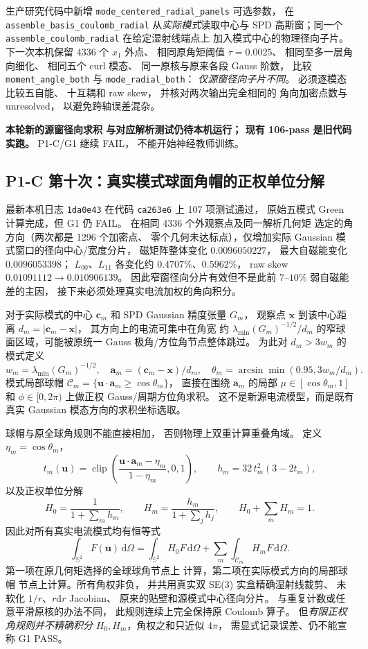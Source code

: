 生产研究代码中新增
\texttt{mode\_centered\_radial\_panels}
可选参数，
在\texttt{assemble\_basis\_coulomb\_radial}
从\emph{实际模式}读取中心与
SPD 高斯窗；同一个
\texttt{assemble\_coulomb\_radial}
在给定湿射线端点上
加入模式中心的物理径向子片。
下一次本机保留 4336 个
$x_1$ 外点、
相同原角矩阈值
$\tau=0.0025$、
相同至多一层角向细化、
相同五个 curl 模态、
同一原核与原来各段 Gauss 阶数，
比较
\texttt{moment\_angle\_both} 与
\texttt{mode\_radial\_both}：
\emph{仅源窗径向子片不同}。
必须逐模态比较五自能、
十互耦和 raw skew，
并核对两次输出完全相同的
角向加密点数与 unresolved，
以避免跨轴误差混杂。

\textbf{本轮新的源窗径向求积
与对应解析测试仍待本机运行；
现有 106-pass 是旧代码实跑。}
P1-C/G1 继续 FAIL，
不能开始神经教师训练。


\subsection{P1-C 第十次：真实模式球面角帽的正权单位分解}
\label{sec:p1-c-real-source-spherical-cap}
最新本机日志 \texttt{1da0e43} 在代码
\texttt{ca263e6} 上 107 项测试通过，
原始五模式 Green 计算完成，但 G1 仍 FAIL。
在相同 4336 个外观察点及同一解析几何矩
选定的角方向（两次都是 1296 个加密点、
零个几何未达标点），仅增加实际 Gaussian
模式窗口的径向中心/宽度分片，
磁矩阵整体变化 $0.0096050227$，
最大自磁能变化 $0.0096053398$；
$L_{00}$、$L_{11}$ 各变化约
$0.4707\%$、$0.5962\%$，
raw skew $0.01091112\to0.010906139$。
因此窄窗径向分片有效但不是此前
$7$--$10\%$ 弱自磁能差的主因，
接下来必须处理真实电流加权的角向积分。

对于实际模式的中心 $\bm c_m$ 和
SPD Gaussian 精度张量 $G_m$，
观察点 $\bm x$ 到该中心距离
$d_m=|\bm c_m-\bm x|$，
其方向上的电流可集中在角宽
约 $\lambda_{\min}(G_m)^{-1/2}/d_m$
的窄球面区域，可能被原统一
Gauss 极角/方位角节点整体跳过。
为此对 $d_m>3w_m$ 的模式定义
\[
 w_m=\lambda_{\min}(G_m)^{-1/2},\quad
 \bm a_m=(\bm c_m-\bm x)/d_m,\quad
 \theta_m=\arcsin\min(0.95,3w_m/d_m).
\]
模式局部球帽
$\mathcal C_m=\{\bm u\cdot\bm a_m
\ge\cos\theta_m\}$，
直接在围绕 $\bm a_m$ 的局部
$\mu\in[\cos\theta_m,1]$ 和
$\phi\in[0,2\pi)$ 上做正权
Gauss/周期方位角求积。
这不是新源电流模型，而是既有真实
Gaussian 模态方向的求积坐标选取。

球帽与原全球角规则不能直接相加，
否则物理上双重计算重叠角域。
定义 $\eta_m=\cos\theta_m$，
\[
 t_m(\bm u)=\operatorname{clip}
 \left(\frac{\bm u\cdot\bm a_m-\eta_m}
 {1-\eta_m},0,1\right),\qquad
 h_m=32\,t_m^2(3-2t_m),
\]
以及正权单位分解
\[
 H_0=\frac1{1+\sum_m h_m},\qquad
 H_m=\frac{h_m}{1+\sum_jh_j},\qquad
 H_0+\sum_mH_m=1.
\]
因此对所有真实电流模式均有恒等式
\[
 \int_{\mathbb S^2}F(\bm u)\,\mathrm d\Omega
 =\int_{\mathbb S^2}H_0F\,\mathrm d\Omega
  +\sum_m\int_{\mathcal C_m}H_mF\,\mathrm d\Omega.
\]
第一项在原几何矩选择的全球球角节点上
计算，第二项在实际模式方向的局部球帽
节点上计算。所有角权非负，
并共用真实双 SE(3) 实盒精确湿射线裁剪、
未软化 $1/r$、$r\mathrm dr$ Jacobian、
原来的贴壁和源模式中心径向分片。
与重复计数或任意平滑原核的办法不同，
此规则连续上完全保持原 Coulomb 算子。
但\emph{有限正权角规则并不精确积分}
$H_0,H_m$，角权之和只近似 $4\pi$，
需显式记录误差、仍不能宣称 G1 PASS。

